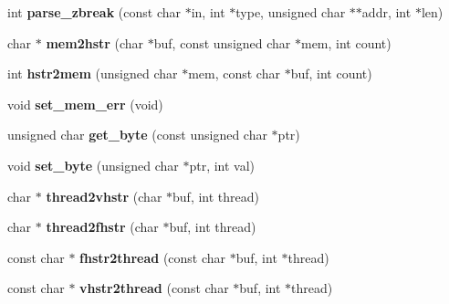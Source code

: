 \begin{DoxyCompactItemize}
\item 
\mbox{\label{group__mips__gdb_gaa38f73303fc0ca4067db5ebce2adb52b}} 
int {\bfseries parse\+\_\+zbreak} (const char $\ast$in, int $\ast$type, unsigned char $\ast$$\ast$addr, int $\ast$len)
\item 
\mbox{\label{group__mips__gdb_gae2de6a9c95549019795eee57ed3aaabf}} 
char $\ast$ {\bfseries mem2hstr} (char $\ast$buf, const unsigned char $\ast$mem, int count)
\item 
\mbox{\label{group__mips__gdb_ga0bcf4ff123cbc3dc18a92ecba66964ce}} 
int {\bfseries hstr2mem} (unsigned char $\ast$mem, const char $\ast$buf, int count)
\item 
\mbox{\label{group__mips__gdb_gaca7491697b19b8aa78e1ee6379ecea55}} 
void {\bfseries set\+\_\+mem\+\_\+err} (void)
\item 
\mbox{\label{group__mips__gdb_gada2c605285d5651291de4aca4ac3e4ea}} 
unsigned char {\bfseries get\+\_\+byte} (const unsigned char $\ast$ptr)
\item 
\mbox{\label{group__mips__gdb_gab72f528bc519f5fb86e7ba497710875c}} 
void {\bfseries set\+\_\+byte} (unsigned char $\ast$ptr, int val)
\item 
\mbox{\label{group__mips__gdb_gae3855ba6afc4392cd4798c3451926306}} 
char $\ast$ {\bfseries thread2vhstr} (char $\ast$buf, int thread)
\item 
\mbox{\label{group__mips__gdb_ga9b4dd3a10bc2652c14ea1d461610a3df}} 
char $\ast$ {\bfseries thread2fhstr} (char $\ast$buf, int thread)
\item 
\mbox{\label{group__mips__gdb_ga66b6ba191d6583327af488e3df116075}} 
const char $\ast$ {\bfseries fhstr2thread} (const char $\ast$buf, int $\ast$thread)
\item 
\mbox{\label{group__mips__gdb_gaefd53f8d98d706cdd2a73349ac413948}} 
const char $\ast$ {\bfseries vhstr2thread} (const char $\ast$buf, int $\ast$thread)
$$
\end{DoxyCompactItemize}
